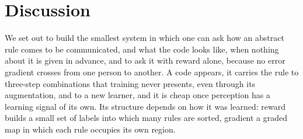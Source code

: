 \documentclass{nature}
\begin{document}
\section*{Discussion}

We set out to build the smallest system in which one can ask how an abstract rule comes to be communicated, and
what the code looks like, when nothing about it is given in advance, and to ask it with reward alone, because no error gradient crosses
from one person to another. A code appears, it carries the rule to three-step combinations that training never
presents, even through its augmentation, and to a new learner, and it is cheap once perception has a learning signal of its own. Its structure depends on how it was learned: reward builds a small set of labels into which many
rules are sorted, gradient a graded map in which each rule occupies its own region.
\end{document}
